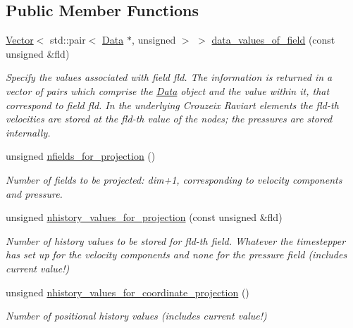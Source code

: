 \subsection*{Public Member Functions}
\begin{DoxyCompactItemize}
\item 
\hyperlink{classoomph_1_1Vector}{Vector}$<$ std\+::pair$<$ \hyperlink{classoomph_1_1Data}{Data} $\ast$, unsigned $>$ $>$ \hyperlink{classoomph_1_1GeneralisedNewtonianProjectableAxisymmetricCrouzeixRaviartElement_acd407ccde8e91cbfa31bda2d62b606cf}{data\+\_\+values\+\_\+of\+\_\+field} (const unsigned \&fld)
\begin{DoxyCompactList}\small\item\em Specify the values associated with field fld. The information is returned in a vector of pairs which comprise the \hyperlink{classoomph_1_1Data}{Data} object and the value within it, that correspond to field fld. In the underlying Crouzeix Raviart elements the fld-\/th velocities are stored at the fld-\/th value of the nodes; the pressures are stored internally. \end{DoxyCompactList}\item 
unsigned \hyperlink{classoomph_1_1GeneralisedNewtonianProjectableAxisymmetricCrouzeixRaviartElement_adb32f53c8b407273afcd7eb95a1dbb54}{nfields\+\_\+for\+\_\+projection} ()
\begin{DoxyCompactList}\small\item\em Number of fields to be projected\+: dim+1, corresponding to velocity components and pressure. \end{DoxyCompactList}\item 
unsigned \hyperlink{classoomph_1_1GeneralisedNewtonianProjectableAxisymmetricCrouzeixRaviartElement_a849ba101f89e2b21525d4131e868f672}{nhistory\+\_\+values\+\_\+for\+\_\+projection} (const unsigned \&fld)
\begin{DoxyCompactList}\small\item\em Number of history values to be stored for fld-\/th field. Whatever the timestepper has set up for the velocity components and none for the pressure field (includes current value!) \end{DoxyCompactList}\item 
unsigned \hyperlink{classoomph_1_1GeneralisedNewtonianProjectableAxisymmetricCrouzeixRaviartElement_a551405a5bd38e4d945e29a7dae405f8e}{nhistory\+\_\+values\+\_\+for\+\_\+coordinate\+\_\+projection} ()
\begin{DoxyCompactList}\small\item\em Number of positional history values (includes current value!) \end{DoxyCompactList}\item 

\end{DoxyCompactItemize}
